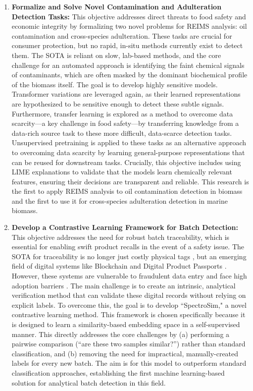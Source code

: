 \begin{enumerate}
\item \textbf{Formalize and Solve Novel Contamination and Adulteration Detection Tasks:} This objective addresses direct threats to food safety and economic integrity by formalizing two novel problems for REIMS analysis: oil contamination and cross-species adulteration. These tasks are crucial for consumer protection, but no rapid, in-situ methods currently exist to detect them. The SOTA is reliant on slow, lab-based methods, and the core challenge for an automated approach is identifying the faint chemical signals of contaminants, which are often masked by the dominant biochemical profile of the biomass itself. The goal is to develop highly sensitive models. Transformer variations are leveraged again, as their learned representations are hypothesized to be sensitive enough to detect these subtle signals. Furthermore, transfer learning is explored as a method to overcome data scarcity---a key challenge in food safety---by transferring knowledge from a data-rich source task to these more difficult, data-scarce detection tasks. Unsupervised pretraining is applied to these tasks as an alternative approach to overcoming data scarcity by learning general-purpose representations that can be reused for downstream tasks. Crucially, this objective includes using LIME explanations to validate that the models learn chemically relevant features, ensuring their decisions are transparent and reliable.
This research is the first to apply REIMS analysis to oil contamination detection in biomass and the first to use it for cross-species adulteration detection in marine biomass.

\item \textbf{Develop a Contrastive Learning Framework for Batch Detection:} This objective addresses the need for robust batch traceability, which is essential for enabling swift product recalls in the event of a safety issue. The SOTA for traceability is no longer just costly physical tags \citep{Mai2010}, but an emerging field of digital systems like Blockchain \citep{dahariya2025enhancing} and Digital Product Passports \citep{jiang2025traceability}. However, these systems are vulnerable to fraudulent data entry \citep{turkson2025digital} and face high adoption barriers \citep{Untal2025}. The main challenge is to create an intrinsic, analytical verification method that can validate these digital records without relying on explicit labels.
To overcome this, the goal is to develop ``SpectroSim," a novel contrastive learning method. This framework is chosen specifically because it is designed to learn a similarity-based embedding space in a self-supervised manner. This directly addresses the core challenges by (a) performing a pairwise comparison (``are these two samples similar?'') rather than standard classification, and (b) removing the need for impractical, manually-created labels for every new batch. The aim is for this model to outperform standard classification approaches, establishing the first machine learning-based solution for analytical batch detection in this field.


\end{enumerate}

